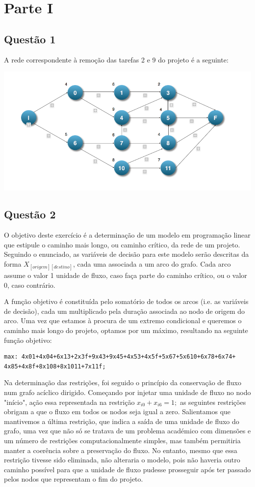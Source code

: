 \documentclass[11pt,titlepage,contentspage,a4paper]{article} %
\begin{document}
\section{Parte I}
\subsection{Questão 1}
A rede correspondente à remoção das tarefas 2 e 9 do projeto é a seguinte:
\begin{center}
\includegraphics[width=\textwidth]{grafo}
\end{center}

\subsection{Questão 2}
O objetivo deste exercício é a determinação de um modelo em programação linear que estipule o caminho mais longo, ou caminho crítico, da rede de um projeto. Seguindo o enunciado, as variáveis de decisão para este modelo serão descritas da forma $X_{[origem ] [destino]}$, cada uma associada a um arco do grafo. Cada arco assume o valor 1 unidade de fluxo, caso faça parte do caminho crítico, ou o valor 0, caso contrário.

A função objetivo é constituída pelo somatório de todos os arcos (i.e. as variáveis de decisão), cada um multiplicado pela duração associada ao nodo de origem do arco. Uma vez que estamos à procura de um extremo condicional e queremos o caminho mais longo do projeto, optamos por um máximo, resultando na seguinte função objetivo:
\begin{Verbatim}[frame=single]
max: 4x01+4x04+6x13+2x3f+9x43+9x45+4x53+4x5f+5x67+5x610+6x78+6x74+
4x85+4x8f+8x108+8x1011+7x11f;
\end{Verbatim}
Na determinação das restrições, foi seguido o princípio da conservação de fluxo num grafo acíclico dirigido. Começando por injetar uma unidade de fluxo no nodo "início", ação essa representada na restrição $x_{i0}+x_{i6}=1; $ as seguintes restrições obrigam a que o fluxo em todos os nodos seja igual a zero. Salientamos que mantivemos a última restrição, que indica a saída de uma unidade de fluxo do grafo, uma vez que não só se tratava de um problema académico com dimensões e um número de restrições computacionalmente simples, mas também permitiria manter a coerência sobre a preservação do fluxo. No entanto, mesmo que essa restrição tivesse sido eliminada, não alteraria o modelo, pois não haveria outro caminho possível para que a unidade de fluxo pudesse prosseguir após ter passado pelos nodos que representam o fim do projeto.
  
\end{document}
